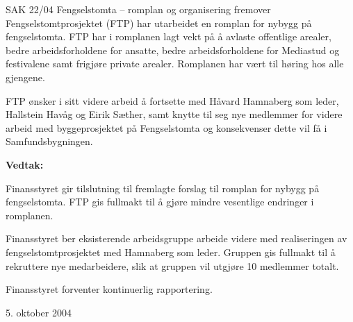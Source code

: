 \begin{instruksledd}{SAK 22/04 Fengselstomta – romplan og organisering fremover}
    Fengselstomtprosjektet (FTP) har utarbeidet en romplan for nybygg på fengselstomta.
    FTP har i romplanen lagt vekt
    på å avlaste offentlige arealer, bedre arbeidsforholdene for ansatte, bedre
    arbeidsforholdene for Mediastud og
    festivalene samt frigjøre private arealer. Romplanen har vært til høring hos alle
    gjengene.

    FTP ønsker i sitt videre arbeid å fortsette med Håvard Hamnaberg som leder, Hallstein
    Havåg og Eirik Sæther, samt
    knytte til seg nye medlemmer for videre arbeid med byggeprosjektet på Fengselstomta og
    konsekvenser dette vil få i
    Samfundsbygningen.
    
    \textbf{Vedtak:}

    Finansstyret gir tilslutning til fremlagte forslag til romplan for nybygg på
    fengselstomta. FTP gis fullmakt til å gjøre
    mindre vesentlige endringer i romplanen.
    
    Finansstyret ber eksisterende arbeidsgruppe arbeide videre med realiseringen av
    fengselstomtprosjektet med
    Hamnaberg som leder. Gruppen gis fullmakt til å rekruttere nye medarbeidere, slik at
    gruppen vil utgjøre 10
    medlemmer totalt.
    
    Finansstyret forventer kontinuerlig rapportering.
    
    5. oktober 2004

\end{instruksledd}


